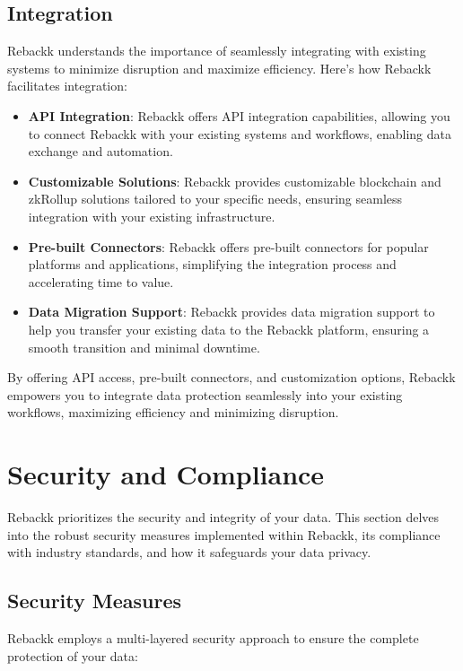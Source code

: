 \documentclass[12pt]{article}
\begin{document}
\subsection{Integration}
Rebackk understands the importance of seamlessly integrating with existing systems to minimize disruption and maximize efficiency. Here's how Rebackk facilitates integration:
\begin{itemize}
    \item \textbf{API Integration}: Rebackk offers API integration capabilities, allowing you to connect Rebackk with your existing systems and workflows, enabling data exchange and automation.
    \item \textbf{Customizable Solutions}: Rebackk provides customizable blockchain and zkRollup solutions tailored to your specific needs, ensuring seamless integration with your existing infrastructure.
    \item \textbf{Pre-built Connectors}: Rebackk offers pre-built connectors for popular platforms and applications, simplifying the integration process and accelerating time to value.
    \item \textbf{Data Migration Support}: Rebackk provides data migration support to help you transfer your existing data to the Rebackk platform, ensuring a smooth transition and minimal downtime.
\end{itemize}

By offering API access, pre-built connectors, and customization options, Rebackk empowers you to integrate data protection seamlessly into your existing workflows, maximizing efficiency and minimizing disruption.

\section{Security and Compliance}
Rebackk prioritizes the security and integrity of your data. This section delves into the robust security measures implemented within Rebackk, its compliance with industry standards, and how it safeguards your data privacy.

\subsection{Security Measures}
Rebackk employs a multi-layered security approach to ensure the complete protection of your data:
\end{document}
